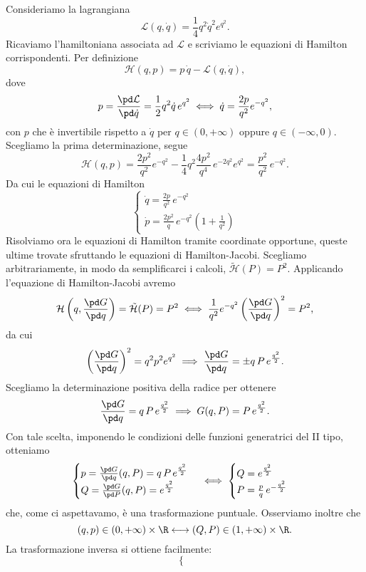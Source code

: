 \begin{ese}
	Consideriamo la lagrangiana
	\[
		\mathcal{L}(q,\dot{q}) = \frac{1}{4}q^2 \dot{q}^2 e^{q^2}.
	\]
	Ricaviamo l'hamiltoniana associata ad \(\mathcal{L}\) e scriviamo le equazioni di Hamilton corrispondenti.
	Per definizione
	\[
		\mathcal{H}(q,p) = p\,\dot{q} - \mathcal{L}(q,\dot{q}),
	\]
	dove
	\[
		p = \frac{\pd\mathcal{L}}{\pd \dot{q}} = \frac{1}{2}q^2 \dot{q}\,e^{q^2} \iff \dot{q} = \frac{2p}{q^2}e^{-q^2},
	\]
	con \(p\) che è invertibile rispetto a \(\dot{q}\) per \(q\in (0,+\infty)\) oppure \(q\in (-\infty,0)\).
	Scegliamo la prima determinazione, segue
	\[
		\mathcal{H}(q,p) = \frac{2p^2}{q^2}e^{-q^2} -\frac{1}{4}q^2 \frac{4p^2}{q^4}\,e^{-2q^2} e^{q^2} = \frac{p^2}{q^2}\,e^{-q^2}.
	\]
	Da cui le equazioni di Hamilton
	\[
		\begin{cases}
			\dot{q} = \frac{2p}{q^2}\,e^{-q^2} \\
			\dot{p} = \frac{2p^2}{q}\,e^{-q^2} \left(1+\frac{1}{q^2}\right)
		\end{cases}
	\]
	Risolviamo ora le equazioni di Hamilton tramite coordinate opportune, queste ultime trovate sfruttando le equazioni di Hamilton-Jacobi.
	Scegliamo arbitrariamente, in modo da semplificarci i calcoli, \(\tilde{\mathcal{H}}(P)=P^2\). Applicando l'equazione di Hamilton-Jacobi avremo
	\[
		\mathcal{H}\left(q,\frac{\pd G}{\pd q}\right) = \tilde{\mathcal{H}}(P) = P^2 \iff \frac{1}{q^2}e^{-q^2} \left( \frac{\pd G}{\pd q} \right)^2 = P^2,
	\]
	da cui
	\[
		\left( \frac{\pd G}{\pd q} \right)^2 = q^2 p^2 e^{q^2} \implies \frac{\pd G}{\pd q} = \pm q\,P\,e^{\frac{q^2}{2}}.
	\]
	Scegliamo la determinazione positiva della radice per ottenere
	\[
		\frac{\pd G}{\pd q} = q\,P\,e^{\frac{q^2}{2}} \implies G(q,P) = P\,e^{\frac{q^2}{2}}.
	\]
	Con tale scelta, imponendo le condizioni delle funzioni generatrici del II tipo, otteniamo
	\[
		\begin{cases}
			p = \frac{\pd G}{\pd q}(q,P) = q\,P\,e^{\frac{q^2}{2}} \\
			Q = \frac{\pd G}{\pd P}(q,P) = e^{\frac{q^2}{2}}
		\end{cases}\iff
		\begin{cases}
			Q = e^{\frac{q^2}{2}} \\
			P = \frac{p}{q}\,e^{-\frac{q^2}{2}}
		\end{cases}
	\]
	che, come ci aspettavamo, è una trasformazione puntuale. Osserviamo inoltre che
	\[
		(q,p) \in (0,+\infty) \times \R \longleftrightarrow (Q,P) \in (1,+\infty) \times \R.
	\]
	La trasformazione inversa si ottiene facilmente:
	\[
		\begin{cases}

\end{cases}\]
\end{ese}
